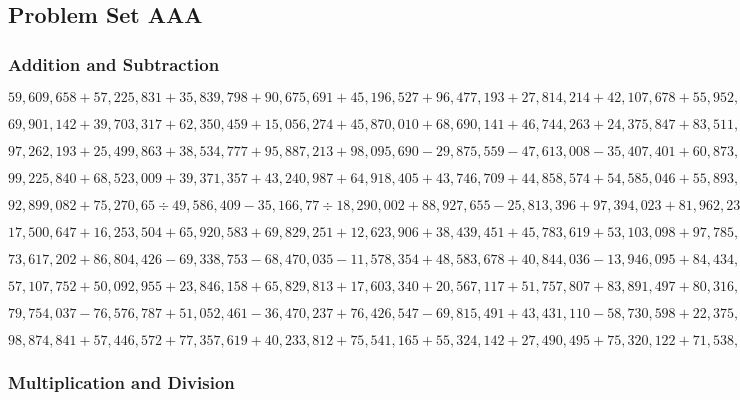 \hypertarget{problem-set-aaa-21}{%
\subsection{Problem Set AAA}\label{problem-set-aaa-21}}

\hypertarget{addition-and-subtraction-377}{%
\subsubsection{Addition and
Subtraction}\label{addition-and-subtraction-377}}

\(59,609,658+57,225,831+35,839,798+90,675,691+45,196,527+96,477,193+27,814,214+42,107,678+55,952,918+44,879,486\)

\(69,901,142+39,703,317+62,350,459+15,056,274+45,870,010+68,690,141+46,744,263+24,375,847+83,511,863+95,349,197\)

\(97,262,193+25,499,863+38,534,777+95,887,213+98,095,690-29,875,559-47,613,008-35,407,401+60,873,813-23,848,981\)

\(99,225,840+68,523,009+39,371,357+43,240,987+64,918,405+43,746,709+44,858,574+54,585,046+55,893,466+44,739,915\)

\(92,899,082+75,270,65÷49,586,409-35,166,77÷18,290,002+88,927,655-25,813,396+97,394,023+81,962,239+64,403,890\)

\(17,500,647+16,253,504+65,920,583+69,829,251+12,623,906+38,439,451+45,783,619+53,103,098+97,785,840+19,307,591\)

\(73,617,202+86,804,426-69,338,753-68,470,035-11,578,354+48,583,678+40,844,036-13,946,095+84,434,975+82,245,872\)

\(57,107,752+50,092,955+23,846,158+65,829,813+17,603,340+20,567,117+51,757,807+83,891,497+80,316,874+23,977,347\)

\(79,754,037-76,576,787+51,052,461-36,470,237+76,426,547-69,815,491+43,431,110-58,730,598+22,375,130+18,612,811\)

\(98,874,841+57,446,572+77,357,619+40,233,812+75,541,165+55,324,142+27,490,495+75,320,122+71,538,675+66,314,557\)

\hypertarget{multiplication-and-division-376}{%
\subsubsection{Multiplication and
Division}\label{multiplication-and-division-376}}

